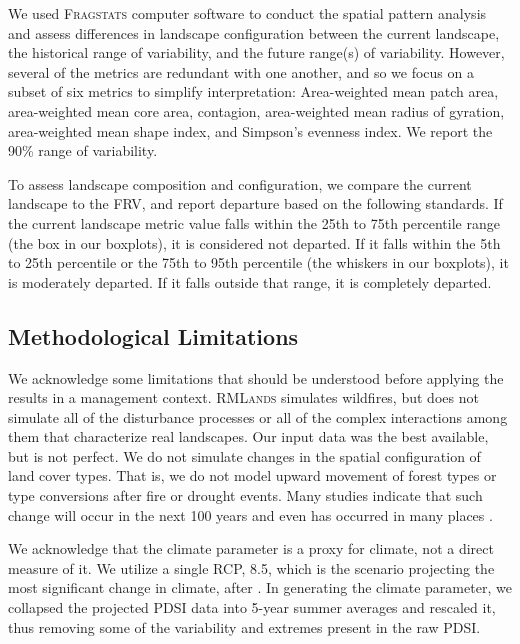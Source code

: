 \documentclass[12pt]{article}
\begin{document}
\begin{spacing}{1}
%
We used \textsc{Fragstats} computer software \citep{Fragstats2012} to conduct the spatial pattern analysis and assess differences in landscape configuration between the current landscape, the historical range of variability, and the future range(s) of variability. However, several of the metrics are redundant with one another, and so we focus on a subset of six metrics to simplify interpretation: Area-weighted mean patch area, area-weighted mean core area, contagion, area-weighted mean radius of gyration, area-weighted mean shape index, and Simpson's evenness index. We report the 90\% range of variability. %

To assess landscape composition and configuration, we compare the current landscape to the FRV, and report departure based on the following standards. If the current landscape metric value falls within the 25th to 75th percentile range (the box in our boxplots), it is considered not departed. If it falls within the 5th to 25th percentile or the 75th to 95th percentile (the whiskers in our boxplots), it is moderately departed. If it falls outside that range, it is completely departed.



\subsection*{Methodological Limitations}
We acknowledge some limitations that should be understood before applying the results in a management context. \textsc{RMLands} simulates wildfires, but does not simulate all of the disturbance processes or all of the complex interactions among them that characterize real landscapes. Our input data was the best available, but is not perfect. We do not simulate changes in the spatial configuration of land cover types. That is, we do not model upward movement of forest types or type conversions after fire or drought events. Many studies indicate that such change will occur in the next 100 years and even has occurred in many places \citep{Bachelet2001}. 

We acknowledge that the climate parameter is a proxy for climate, not a direct measure of it. We utilize a single RCP, 8.5, which is the scenario projecting the most significant change in climate, after \citet{Cook2014}. In generating the climate parameter, we collapsed the projected PDSI data into 5-year summer averages and rescaled it, thus removing some of the variability and extremes present in the raw PDSI.













\end{spacing}
\end{document}
